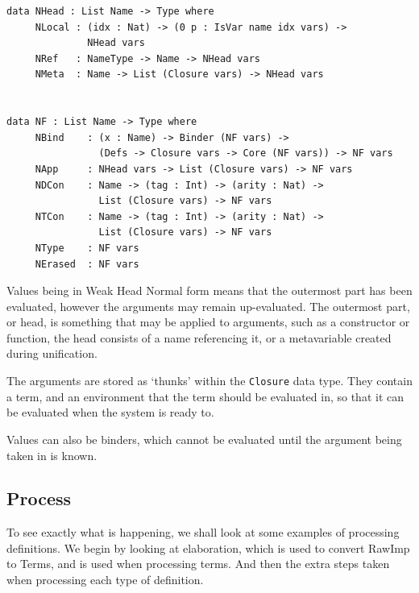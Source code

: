 \documentclass[a4paper]{article}
\begin{document}
\begin{center}
\begin{verbatim}
data NHead : List Name -> Type where
	 NLocal : (idx : Nat) -> (0 p : IsVar name idx vars) ->
			  NHead vars
	 NRef   : NameType -> Name -> NHead vars
	 NMeta  : Name -> List (Closure vars) -> NHead vars


data NF : List Name -> Type where
	 NBind    : (x : Name) -> Binder (NF vars) ->
				(Defs -> Closure vars -> Core (NF vars)) -> NF vars
	 NApp     : NHead vars -> List (Closure vars) -> NF vars
	 NDCon    : Name -> (tag : Int) -> (arity : Nat) ->
				List (Closure vars) -> NF vars
	 NTCon    : Name -> (tag : Int) -> (arity : Nat) ->
				List (Closure vars) -> NF vars
	 NType    : NF vars
	 NErased  : NF vars
\end{verbatim}
\end{center}

Values being in Weak Head Normal form means that the outermost part has 
been evaluated, however the arguments may remain up-evaluated. The 
outermost part, or head, is something that may be applied to arguments, 
such as a constructor or function, the head consists of a
name referencing it, or a metavariable created during unification. 

The arguments are stored as `thunks' within the \texttt{Closure} data type.  
They contain a term, and an environment that the term should be evaluated 
in, so that it can be evaluated when the system is ready to. 

Values can also be binders, which cannot be evaluated until the argument
being taken in is known. 

\subsection{Process}
\label{sec:orgecfa1fe}
To see exactly what is happening, we shall look at some examples of 
processing definitions. We begin by looking at elaboration, which is 
used to convert RawImp to Terms, and is used when processing terms. 
And then the extra steps taken when processing each type of definition. 
\end{document}
